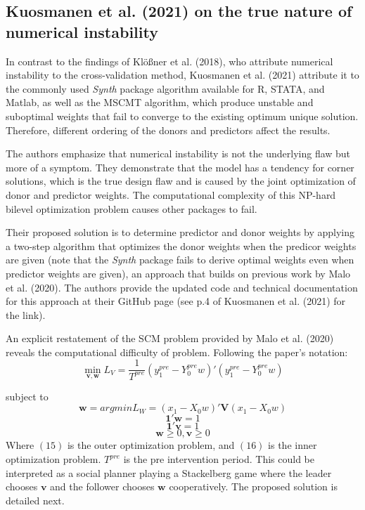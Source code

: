 \documentclass[12pt,a4paper,draft]{article}
\begin{document}
\subsection{Kuosmanen et al. (2021) on the true nature of numerical instability}

In contrast to the findings of Klößner et al. (2018), who attribute numerical 
instability to the cross-validation method, Kuosmanen et al. (2021) attribute it to 
the commonly used \emph{Synth} package algorithm available for R, STATA, and Matlab, 
as well as the MSCMT algorithm, which produce unstable and suboptimal weights that 
fail to converge to the existing optimum unique solution. 
Therefore, different ordering of the donors and predictors affect the results. 

The authors emphasize that numerical instability is not the underlying flaw but 
more of a symptom. They demonstrate that the model has a tendency for corner 
solutions, which is the true design flaw and is caused by the joint optimization 
of donor and predictor weights. The computational complexity of this NP-hard 
bilevel optimization problem causes other packages to fail.

Their proposed solution is to determine predictor and donor 
weights by applying a two-step algorithm that optimizes the donor 
weights when the predicor weights are given (note that the \emph{Synth} package 
fails to derive optimal weights even when predictor weights are given), 
an approach that builds on previous work by Malo et al. (2020). The
authors provide the updated code and technical documentation for this approach 
at their GitHub page (see p.4 of Kuosmanen et al. (2021) for the link).

An explicit restatement of the SCM problem provided by Malo et al. (2020) 
reveals the computational difficulty of problem. Following the paper's 
notation:
\begin{equation}
    \min_{\mathbf{v,w}} L_V = 
    \frac{1}{T^{pre}} \left(y_1^{pre}-Y_0^{pre}w\right) ' 
    \left( y_1^{pre}-Y_0^{pre}w \right)
\end{equation}

subject to
\begin{equation}
    \mathbf{w}= argmin L_W = \left( x_1-X_0 w \right) ' \mathbf{V}
    \left( x_1 - X_0 w\right)
\end{equation}
$$\mathbf{1'w}=1$$
$$\mathbf{1'v}=1$$
$$\mathbf{w}\ge 0, \mathbf{v} \ge 0$$
Where $(15)$ is the outer optimization problem, and $(16)$ is the inner 
optimization problem. $T^{pre}$ is the pre intervention period. This could be 
interpreted as a social planner playing a Stackelberg game where the 
leader chooses $\mathbf{v}$ and the follower chooses $\mathbf{w}$ cooperatively.
\newline
The proposed solution is detailed next.
\end{document}
